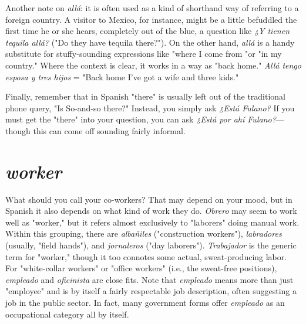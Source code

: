 Another note on \emph{allá}: it is often used as a kind of shorthand
way of referring to a foreign country. A visitor to Mexico, for instance,
might be a little befuddled the first time he or she hears, completely
out of the blue, a question like \emph{¿Y tienen tequila allá?} ("Do they have
tequila there?"). On the other hand, \emph{allá} is a handy substitute for
stuffy-sounding expressions like "where I come from "or "in my country." Where the context is clear, it works in a way as "back home."
\emph{Allá tengo esposa y tres hijos} = "Back home I've got a wife and
three kids."

Finally, remember that in Spanish "there" is usually left out of
the traditional phone query, "Is So-and-so there?" Instead, you simply
ask \emph{¿Está Fulano?} If you must get the "there" into your question, you
can ask \emph{¿Está por ahí Fulano?}---though this can come off sounding
fairly informal.

\section{\emph{worker}}

What should you call your co-workers? That may depend on
your mood, but in Spanish it also depends on what kind of work they
do. \emph{Obrero} may seem to work well as "worker," but it refers almost
exclusively to "laborers" doing manual work. Within this grouping,
there are \emph{albañiles} ("construction workers"), \emph{labradores} (usually,
"field hands"), and \emph{jornaleros} ("day laborers"). \emph{Trabajador} is the generic term for "worker," though it too connotes some actual, sweat-producing labor. For "white-collar workers" or "office workers" (i.e.,
the sweat-free positions), \emph{empleado} and \emph{oficinista} are close fits. Note
that \emph{empleado} means more than just "employee" and is by itself a
fairly respectable job description, often suggesting a job in the public
sector. In fact, many government forms offer \emph{empleado} as an occupational category all by itself.

